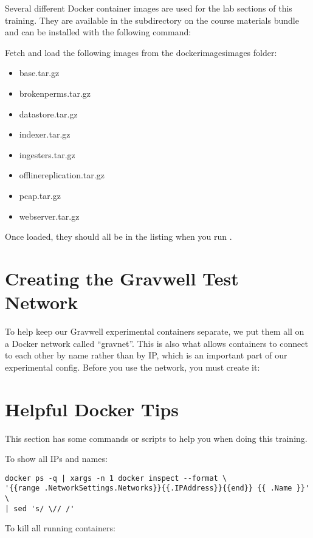Several different Docker container images are used for the lab sections
of this training. They are available in the  subdirectory on
the course materials bundle and can be installed with the following
command:


Fetch and load the following images from the dockerimagesimages folder:

\begin{itemize}
	\item base.tar.gz
	\item brokenperms.tar.gz
	\item datastore.tar.gz
	\item indexer.tar.gz
	\item ingesters.tar.gz
	\item offlinereplication.tar.gz
	\item pcap.tar.gz
	\item webserver.tar.gz
\end{itemize}

Once loaded, they should all be in the listing when you run .

\section{Creating the Gravwell Test Network}

To help keep our Gravwell experimental containers separate, we put them
all on a Docker network called ``gravnet''. This is also what allows
containers to connect to each other by name rather than by IP, which is
an important part of our experimental config. Before you use the
network, you must create it:



\section{Helpful Docker Tips}

This section has some commands or scripts to help you when doing this
training.

To show all IPs and names:

\begin{Verbatim}[breaklines=true]
docker ps -q | xargs -n 1 docker inspect --format \
'{{range .NetworkSettings.Networks}}{{.IPAddress}}{{end}} {{ .Name }}' \
| sed 's/ \// /'
\end{Verbatim}

To kill all running containers:



